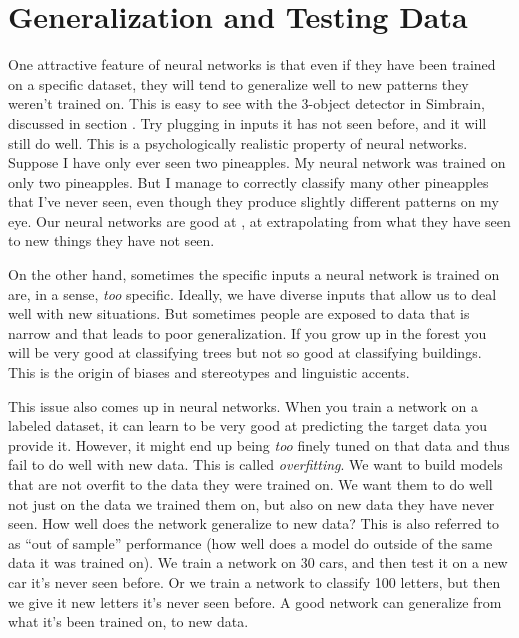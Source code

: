 \section{Generalization and Testing Data }\label{generalization}

One attractive feature of neural networks is that even if they have been trained on a specific dataset, they will tend to generalize well to new patterns they weren't trained on. This is easy to see with the 3-object detector in Simbrain, discussed in section . Try plugging in inputs it has not seen before, and it will still do well. This is a psychologically realistic property of neural networks. Suppose I have only ever seen two pineapples. My neural network was trained on only two pineapples. But I manage to correctly classify many other pineapples that I've never seen, even though they produce slightly different patterns on my eye. Our neural networks are good at , at extrapolating from what they have seen to new things they have not seen.

On the other hand, sometimes the specific inputs a neural network is trained on are, in a sense, \emph{too} specific. Ideally, we have diverse inputs that allow us to deal well with new situations. But sometimes people are exposed to  data that is narrow and that leads to poor generalization. If you grow up in the forest you will be very good at classifying trees but not so good at classifying buildings. This is the origin of biases and stereotypes and linguistic accents. 

This issue also comes up in neural networks. When you train a network on a labeled dataset, it can learn to be very good at predicting the target data you provide it. However, it might end up being \emph{too} finely tuned on that data and thus fail to do well with new data. This is called \emph{overfitting}. We want to build models that are not overfit to the data they were trained on. We want them to do well not just on the data we trained them on, but also on new data they have never seen. How well does the network generalize to new data?  This is also referred to as ``out of sample'' performance (how well does a model do outside of the same data it was trained on). We train a network on 30 cars, and then test it on a new car it's never seen before. Or we train a network to classify 100 letters, but then we give it new letters it's never seen before. A good network can generalize from what it's been trained on, to new data.

